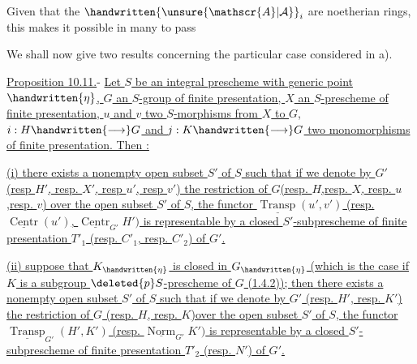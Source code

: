 
Given that the $\handwritten{\unsure{\mathscr{A}|\mathcal{A}}}_i$ are  noetherian rings, this makes it possible in many to pass

We shall now give two results concerning the particular case considered in a).

\uline{Proposition 10.11.}- \uline{Let $S$ be an integral prescheme with generic point $\handwritten{\eta}$, $G$ an $S$-group of finite presentation, $X$ an $S$-prescheme of finite presentation, $u$ and $v$ two $S$-morphisms from $X$ to $G$, $i:H\handwritten{\longrightarrow}G$ and $j:K\handwritten{\longrightarrow}G$ two monomorphisms of finite presentation. Then :}

\uline{(i) there exists a nonempty open subset $S'$ of $S$ such that if we denote by $G'$ (resp $H'$, resp. $X'$, resp $u'$, resp $v'$) the restriction of $G$(resp. $H$,resp. $X$, resp. $u$,resp. $v$) over the open subset $S'$ of $S$, the functor $\underline{\operatorname{Transp}}(u',v')$ (resp. $\underline{\operatorname{Centr}}(u')$, $\underline{\operatorname{Centr}}_{G'}H')$ is representable by a closed $S'$-subprescheme of finite presentation $T'_1$ (resp. $C'_1$, resp. $C'_2$) of $G'$.}

\uline{(ii) suppose that $K_{\handwritten{\eta}}$ is closed in $G_{\handwritten{\eta}}$ (which is the case if $K$ is a subgroup $\deleted{p}S$-prescheme of $G$ (1.4.2)); then there exists a nonempty open subset $S'$ of $S$ such that if we denote by $G'$ (resp. $H'$, resp. $K'$) the restriction of $G$ (resp. $H$, resp. $K$)over the open subset $S'$ of $S$, the functor $\underline{\operatorname{Transp}}_{G'}(H',K')$ (resp. $\underline{\operatorname{Norm}}_{G'}K')$ is representable by a closed $S'$-subprescheme of finite presentation $T'_2$ (resp. $N'$) of $G'$.}

